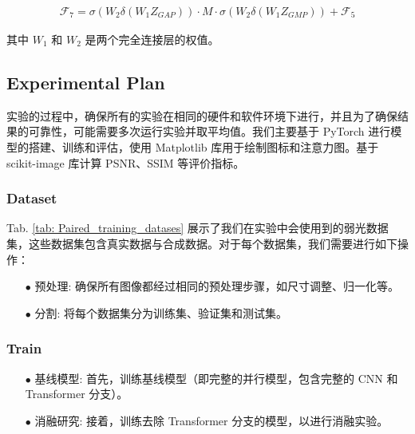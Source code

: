 \documentclass[a4paper]{ctexart}
\begin{document}
	\begin{equation}
		\begin{aligned}
			\mathcal{F}_7 = \sigma \left( W_2 \delta (W_1 Z_{GAP}) \right) \cdot M \cdot \sigma \left( W_2 \delta (W_1 Z_{GMP})\right) +  \mathcal{F}_5
		\end{aligned}
		\label{eq: recalibrated feature map}
	\end{equation}
	
	其中 $W_1$ 和 $W_2$ 是两个完全连接层的权值。
	
	\subsection{Experimental Plan}
	
	实验的过程中，确保所有的实验在相同的硬件和软件环境下进行，并且为了确保结果的可靠性，可能需要多次运行实验并取平均值。我们主要基于 PyTorch 进行模型的搭建、训练和评估，使用 Matplotlib 库用于绘制图标和注意力图。基于 scikit-image 库计算 PSNR、SSIM 等评价指标。
	
	\subsubsection{Dataset}
	
	Tab. \ref{tab: Paired_training_datases} 展示了我们在实验中会使用到的弱光数据集，这些数据集包含真实数据与合成数据。对于每个数据集，我们需要进行如下操作：
	
	\begin{itemize}
		\item [$\bullet$]
		预处理: 确保所有图像都经过相同的预处理步骤，如尺寸调整、归一化等。
		
		\item [$\bullet$]
		分割: 将每个数据集分为训练集、验证集和测试集。
	\end{itemize}
	
	\subsubsection{Train}
	
	\begin{itemize}
		\item [$\bullet$]
		基线模型: 首先，训练基线模型（即完整的并行模型，包含完整的 CNN 和 Transformer 分支）。
		
		\item [$\bullet$]
		消融研究: 接着，训练去除 Transformer 分支的模型，以进行消融实验。
	\end{itemize}
	
\end{document}
